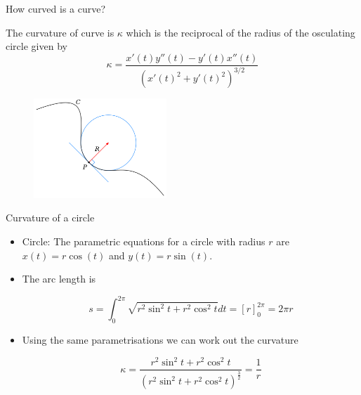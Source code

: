 \documentclass{beamer}
\begin{document}
\begin{frame}{How curved is a curve?}
	\begin{Theorem}[Curvature]
		The curvature of curve is $\kappa$ which is the reciprocal of the radius of the {\alert{osculating circle}} given by
		\[
		\kappa=\frac{x'(t) y''(t) - y'(t) x''(t)}{\left( x'(t)^2 + y'(t)^2 \right)^{3/2}}
		\]
	\end{Theorem}
	\begin{figure}
	\centering
	\includegraphics[width=50mm, scale=0.4]{Curvature_circle.png}
\end{figure}
\end{frame}

\begin{frame}{Curvature of a circle}
	\begin{itemize}	
		
		\item Circle: The parametric equations for a circle with radius $r$ are $x(t)=r \cos(t)$ and $y(t)= r \sin(t)$. 
		\item The arc length is 
		
		\[	
		s = \int_{0}^{2 \pi} \sqrt{r^2 \sin^2 t + r^2 \cos^2 t}dt = \left[r \right]_{0}^{2 \pi} = 2 \pi r
		\]
	
		\item Using the same parametrisations we can work out the curvature
		
		\[
		\kappa = \frac{r^2 \sin^2 t + r^2 \cos^2 t}{\left(r^2 \sin^2 t + r^2 \cos^2 t \right) ^ \frac{3}{2}} = \frac{1}{r}
		\]
		
	\end{itemize}
\end{frame}
\end{document}
